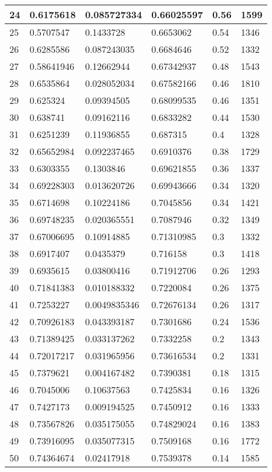 \begin{longtable}{|l|l|l|l|l|l|}
24 & 0.6175618 & 0.085727334 & 0.66025597 & 0.56 & 1599 \\ \hline 
25 & 0.5707547 & 0.1433728 & 0.6653062 & 0.54 & 1346 \\ \hline 
26 & 0.6285586 & 0.087243035 & 0.6684646 & 0.52 & 1332 \\ \hline 
27 & 0.58641946 & 0.12662944 & 0.67342937 & 0.48 & 1543 \\ \hline 
28 & 0.6535864 & 0.028052034 & 0.67582166 & 0.46 & 1810 \\ \hline 
29 & 0.625324 & 0.09394505 & 0.68099535 & 0.46 & 1351 \\ \hline 
30 & 0.638741 & 0.09162116 & 0.6833282 & 0.44 & 1530 \\ \hline 
31 & 0.6251239 & 0.11936855 & 0.687315 & 0.4 & 1328 \\ \hline 
32 & 0.65652984 & 0.092237465 & 0.6910376 & 0.38 & 1729 \\ \hline 
33 & 0.6303355 & 0.1303846 & 0.69621855 & 0.36 & 1337 \\ \hline 
34 & 0.69228303 & 0.013620726 & 0.69943666 & 0.34 & 1320 \\ \hline 
35 & 0.6714698 & 0.10224186 & 0.7045856 & 0.34 & 1421 \\ \hline 
36 & 0.69748235 & 0.020365551 & 0.7087946 & 0.32 & 1349 \\ \hline 
37 & 0.67006695 & 0.10914885 & 0.71310985 & 0.3 & 1332 \\ \hline 
38 & 0.6917407 & 0.0435379 & 0.716158 & 0.3 & 1418 \\ \hline 
39 & 0.6935615 & 0.03800416 & 0.71912706 & 0.26 & 1293 \\ \hline 
40 & 0.71841383 & 0.010188332 & 0.7220084 & 0.26 & 1375 \\ \hline 
41 & 0.7253227 & 0.0049835346 & 0.72676134 & 0.26 & 1317 \\ \hline 
42 & 0.70926183 & 0.043393187 & 0.7301686 & 0.24 & 1536 \\ \hline 
43 & 0.71389425 & 0.033137262 & 0.7332258 & 0.2 & 1343 \\ \hline 
44 & 0.72017217 & 0.031965956 & 0.73616534 & 0.2 & 1331 \\ \hline 
45 & 0.7379621 & 0.004167482 & 0.7390381 & 0.18 & 1315 \\ \hline 
46 & 0.7045006 & 0.10637563 & 0.7425834 & 0.16 & 1326 \\ \hline 
47 & 0.7427173 & 0.009194525 & 0.7450912 & 0.16 & 1333 \\ \hline 
48 & 0.73567826 & 0.035175055 & 0.74829024 & 0.16 & 1383 \\ \hline 
49 & 0.73916095 & 0.035077315 & 0.7509168 & 0.16 & 1772 \\ \hline 
50 & 0.74364674 & 0.02417918 & 0.7539378 & 0.14 & 1585 \\ \hline 
\end{longtable}
